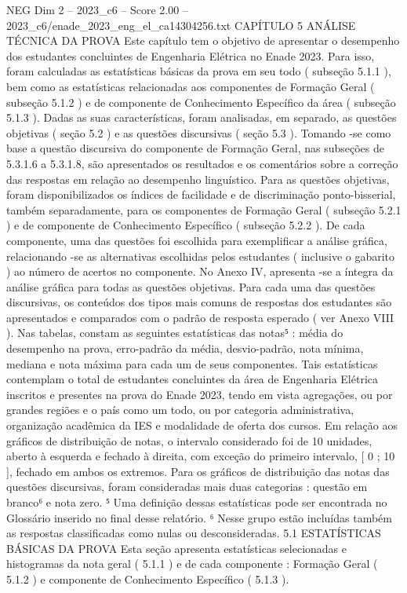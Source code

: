 \begin{textsample}{NEG Dim 2 – 2023\_c6 – Score 2.00 – 2023\_c6/enade\_2023\_eng\_el\_ca14304256.txt}  \label{ex:f2_neg_273}
CAPÍTULO 5 ANÁLISE TÉCNICA DA PROVA Este capítulo tem o objetivo de apresentar o desempenho dos estudantes concluintes de Engenharia Elétrica no Enade 2023.
Para isso, foram calculadas as estatísticas básicas da prova em seu todo ( subseção 5.1.1 ), bem como as estatísticas relacionadas aos componentes de Formação Geral ( subseção 5.1.2 ) e de componente de Conhecimento Específico da área ( subseção 5.1.3 ).
Dadas as suas características, foram analisadas, em separado, as questões objetivas ( seção 5.2 ) e as questões discursivas ( seção 5.3 ).
Tomando -se como base a questão discursiva do componente de Formação Geral, nas subseções de 5.3.1.6 a 5.3.1.8, são apresentados os resultados e os comentários sobre a correção das respostas em relação ao desempenho linguístico.
Para as questões objetivas, foram disponibilizados os índices de facilidade e de discriminação ponto-bisserial, também separadamente, para os componentes de Formação Geral ( subseção 5.2.1 ) e de componente de Conhecimento Específico ( subseção 5.2.2 ).
De cada componente, uma das questões foi escolhida para exemplificar a análise gráfica, relacionando -se as alternativas escolhidas pelos estudantes ( inclusive o gabarito ) ao número de acertos no componente.
No Anexo IV, apresenta -se a íntegra da análise gráfica para todas as questões objetivas.
Para cada uma das questões discursivas, os conteúdos dos tipos mais comuns de respostas dos estudantes são apresentados e comparados com o padrão de resposta esperado ( ver Anexo VIII ).
Nas tabelas, constam as seguintes estatísticas das notas⁵ : média do desempenho na prova, erro-padrão da média, desvio-padrão, nota mínima, mediana e nota máxima para cada um de seus componentes.
Tais estatísticas contemplam o total de estudantes concluintes da área de Engenharia Elétrica inscritos e presentes na prova do Enade 2023, tendo em vista agregações, ou por grandes regiões e o país como um todo, ou por categoria administrativa, organização acadêmica da IES e modalidade de oferta dos cursos.
Em relação aos gráficos de distribuição de notas, o intervalo considerado foi de 10 unidades, aberto à esquerda e fechado à direita, com exceção do primeiro intervalo, [ 0 ; 10 ], fechado em ambos os extremos.
Para os gráficos de distribuição das notas das questões discursivas, foram consideradas mais duas categorias : questão em branco⁶ e nota zero. ⁵ Uma definição dessas estatísticas pode ser encontrada no Glossário inserido no final desse relatório. ⁶ Nesse grupo estão incluídas também as respostas classificadas como nulas ou desconsideradas. 5.1 ESTATÍSTICAS BÁSICAS DA PROVA Esta seção apresenta estatísticas selecionadas e histogramas da nota geral ( 5.1.1 ) e de cada componente : Formação Geral ( 5.1.2 ) e componente de Conhecimento Específico ( 5.1.3 ).

\end{textsample}
